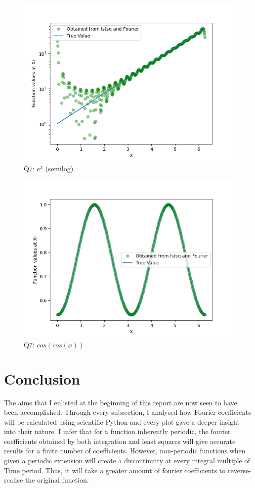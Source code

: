 \documentclass[11pt, a4paper]{article}
\begin{document}
   
   \begin{figure}[!tbh]
   	\centering
  \includegraphics[scale=0.5]{q7-exp.png} 
    \caption{Q7: $e^x$ (semilog)}
   	\label{fig: exp()}
   \end{figure}
   
   
   \begin{figure}[!tbh]
   	\centering
  \includegraphics[scale=0.5]{q7-cos.png} 
    \caption{Q7: $cos(cos(x))$}
   	\label{fig: coscos()}
   \end{figure}
   
\newpage
\section{Conclusion}
The aims that I enlisted at the beginning of this report are now seen to have been accomplished. Through every subsection, I analysed how Fourier coefficients will be calculated using scientific Python and every plot gave a deeper insight into their nature. I infer that for a function inherently periodic, the fourier coefficients obtained by both integration and least squares will give accurate results for a finite number of coefficients. However, non-periodic functions when given a periodic extension will create a discontinuity at every integral multiple of Time period. Thus, it will take a greater amount of fourier coefficients to reverse-realise the original function. 
\end{document}
